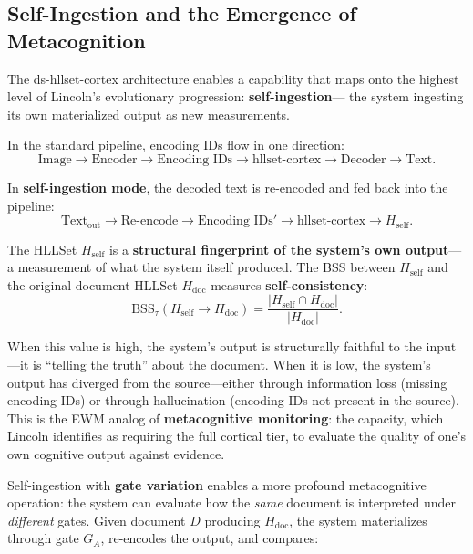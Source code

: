 \documentclass[11pt,a4paper]{article}
\theoremstyle{remark}
\begin{document}
\subsection{Self-Ingestion and the Emergence of Metacognition}
\label{sec:cortex-self}

The ds-hllset-cortex architecture enables a capability that maps onto the
highest level of Lincoln's evolutionary progression: \textbf{self-ingestion}---
the system ingesting its own materialized output as new measurements.

In the standard pipeline, encoding IDs flow in one direction:
\begin{equation}
  \text{Image} \to \text{Encoder} \to \text{Encoding IDs} \to
  \text{hllset-cortex} \to \text{Decoder} \to \text{Text}.
\end{equation}

In \textbf{self-ingestion mode}, the decoded text is re-encoded and fed back
into the pipeline:
\begin{equation}
  \text{Text}_{\text{out}} \to \text{Re-encode} \to \text{Encoding IDs}'
  \to \text{hllset-cortex} \to H_{\text{self}}.
\end{equation}

The HLLSet $H_{\text{self}}$ is a \textbf{structural fingerprint of the
system's own output}---a measurement of what the system itself produced. The
BSS between $H_{\text{self}}$ and the original document HLLSet $H_{\text{doc}}$
measures \textbf{self-consistency}:
\begin{equation}
  \text{BSS}_{\tau}(H_{\text{self}} \to H_{\text{doc}}) =
  \frac{|H_{\text{self}} \cap H_{\text{doc}}|}{|H_{\text{doc}}|}.
\end{equation}

When this value is high, the system's output is structurally faithful to the
input---it is ``telling the truth'' about the document. When it is low, the
system's output has diverged from the source---either through information loss
(missing encoding IDs) or through hallucination (encoding IDs not present in the
source). This is the EWM analog of \textbf{metacognitive monitoring}: the
capacity, which Lincoln identifies as requiring the full cortical tier, to
evaluate the quality of one's own cognitive output against evidence.

Self-ingestion with \textbf{gate variation} enables a more profound
metacognitive operation: the system can evaluate how the \textit{same} document
is interpreted under \textit{different} gates. Given document $D$ producing
$H_{\text{doc}}$, the system materializes through gate $G_A$, re-encodes the
output, and compares:
\end{document}
